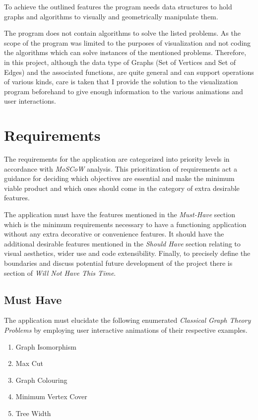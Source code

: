To achieve the outlined features the program needs data structures to hold
graphs and algorithms to visually and geometrically manipulate them. 

The program does not contain algorithms to solve
the listed problems. As the scope of the program was limited to the purposes of
visualization and not coding the algorithms which can solve instances of the
mentioned problems.  Therefore, in this project, although the data type of
Graphs (Set of Vertices and Set of Edges) and the associated functions, are
quite general and can support operations of various kinds, care is taken that I
provide the solution to the visualization program beforehand to give enough
information to the various animations and user interactions.


\section{Requirements}
\label{requirements: requirements}

The requirements for the application are categorized into priority
levels in accordance with \emph{MoSCoW} analysis. This prioritization of
requirements act a guidance for deciding which objectives are essential and
make the minimum viable product and which ones should come in the category of
extra desirable features. \cite{Hudaib2018}

The application must have the features mentioned in the \emph{Must-Have} section which is the minimum requirements necessary to have a functioning
application without any extra decorative or convenience features. It should have the additional
desirable features mentioned in the \emph{Should Have} section relating to
visual aesthetics, wider use and code extensibility.  Finally, to precisely
define the boundaries and discuss potential future development of the project there is section of \emph{Will Not Have
This Time}.

\subsection{Must Have}
\label{requirements: musthave}
The application must elucidate the following enumerated \emph{Classical Graph Theory
Problems} by employing user interactive animations of their respective examples.
\begin{enumerate}
\item Graph Isomorphism
\item Max Cut
\item Graph Colouring
\item Minimum Vertex Cover
\item Tree Width
\end{enumerate}

